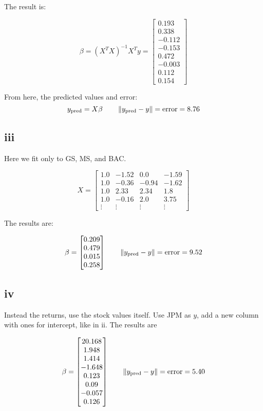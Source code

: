 \documentclass{article}
\begin{document}
The result is:

$$\displaystyle \beta = (X^T X)^{-1} X^T y = \left[\begin{matrix}0.193\\0.338\\-0.112\\-0.153\\0.472\\-0.003\\0.112\\0.154\end{matrix}\right]$$

From here, the predicted values and error:
\[{y_{{\rm{pred}}}} = X\beta \qquad \left\| {{y_{{\rm{pred}}}} - y} \right\| = {\rm{error}} = 8.76\]

\subsection*{iii}
Here we fit only to GS, MS, and BAC.

$$\displaystyle X  = \left[\begin{matrix}1.0 & -1.52 & 0.0 & -1.59\\1.0 & -0.36 & -0.94 & -1.62\\1.0 & 2.33 & 2.34 & 1.8\\1.0 & -0.16 & 2.0 & 3.75\\ \vdots & \vdots & \vdots & \vdots\end{matrix}\right]$$

The results are:

$$\displaystyle \beta = \left[\begin{matrix}0.209\\0.479\\0.015\\0.258\end{matrix}\right]\qquad \left\| {{y_{{\rm{pred}}}} - y} \right\| = {\rm{error}} = 9.52$$
\subsection*{iv}
Instead the returns, use the stock values itself. Use JPM as $y$, add a new column with ones for intercept, like in ii. The results are

$$\displaystyle \beta = \left[\begin{matrix}20.168\\1.948\\1.414\\-1.648\\0.123\\0.09\\-0.057\\0.126\end{matrix}\right] \qquad \left\|  {{y_{{\rm{pred}}}} - y} \right\| = {\rm{error}} = 5.40$$
\end{document}

